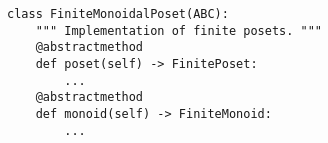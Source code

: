 \begin{verbatim}
class FiniteMonoidalPoset(ABC):
    """ Implementation of finite posets. """
    @abstractmethod
    def poset(self) -> FinitePoset:
        ...
    @abstractmethod
    def monoid(self) -> FiniteMonoid:
        ...
\end{verbatim}